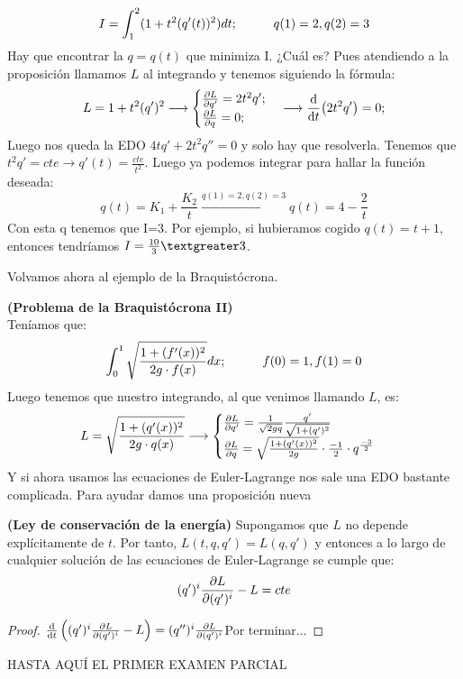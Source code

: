 \documentclass[palatino, bibnumbers]{apuntes}
\begin{document}
\begin{example}$$I=\int_{1}^{2}(1+t^2(q'(t))^2)dt;\hspace*{1cm} q(1)=2, q(2)=3$$
	Hay que encontrar la $q=q(t)$ que minimiza I. ¿Cuál es? Pues atendiendo a la proposición llamamos $L$ al integrando y tenemos siguiendo la fórmula: $$L=1+t^2(q')^2\longrightarrow\begin{cases}
	\pdv{L}{q'}=2t^2q';\\
	\pdv{L}{q}=0;
	\end{cases}\longrightarrow\dv{t}(2t^2q')=0;$$
	Luego nos queda la EDO $4tq'+2t^2q''=0$ y solo hay que resolverla. Tenemos que $t^2q'=cte\rightarrow q'(t)=\frac{cte}{t^2}$. Luego ya podemos integrar para hallar la función deseada: $$q(t)=K_1+\frac{K_2}{t}\xrightarrow{q(1)=2, q(2)=3}q(t)=4-\frac{2}{t}$$
Con esta q tenemos que I=3. Por ejemplo, si hubieramos cogido $q(t)=t+1$, entonces tendríamos $I=\frac{10}{3}\textgreater3$.\\
\end{example}
Volvamos ahora al ejemplo de la Braquistócrona.
\begin{example}\textbf{(Problema de la Braquistócrona II)}\\
Teníamos que:
$$\int_{0}^{1}\sqrt{\frac{1+(f'(x))^2}{2g\cdot f(x)}}dx;\hspace*{1cm} f(0)=1,f(1)=0$$ 
\newpage
Luego tenemos que nuestro integrando, al que venimos llamando $L$, es:
$$L=\sqrt{\frac{1+(q'(x))^2}{2g\cdot q(x)}}\longrightarrow\begin{cases}\pdv{L}{q'}=\frac{1}{\sqrt{2gq}}\frac{q'}{\sqrt{1+(q')^2}}\\
\pdv{L}{q}=\sqrt{\frac{1+(q'(x))^2}{2g}}\cdot\frac{-1}{2}\cdot q^{\frac{-3}{2}}
\end{cases}$$
Y si ahora usamos las ecuaciones de Euler-Lagrange nos sale una EDO bastante complicada. Para ayudar damos una proposición nueva
\end{example}
\begin{prop}\textbf{(Ley de conservación de la energía)} Supongamos que $L$ no depende explícitamente de $t$. Por tanto, $L(t,q,q')=L(q,q')$ y entonces a lo largo de cualquier solución de las ecuaciones de Euler-Lagrange se cumple que:
\begin{equation}
(q')^i\pdv{L}{(q')^i}-L=cte
\end{equation}
\end{prop}
\begin{proof}
	$\dv{t}\left((q')^i\pdv{L}{(q')^i}-L\right)=(q'')^i\pdv{L}{(q')^i}$Por terminar...
\end{proof}
HASTA AQUÍ EL PRIMER EXAMEN PARCIAL\\
\end{document}
